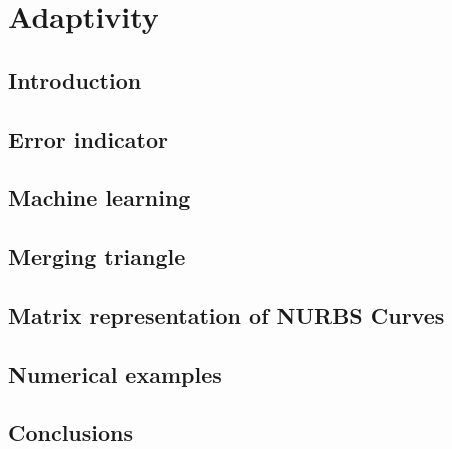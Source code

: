 
\chapter{Adaptivity}
\label{adp_sec:main}
\section{Introduction}


\section{Error indicator}
\label{adap_sec:error_indicator}


\section{Machine learning}



\section{Merging triangle}
\label{adap_merge_triangle}




\section{Matrix representation of NURBS Curves}
\label{adap_sec_mrep2d}



\section{Numerical examples}




\section{Conclusions}

